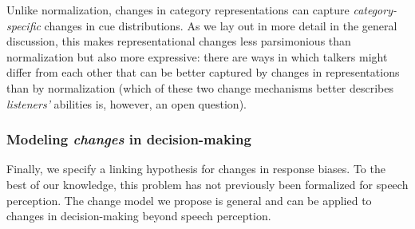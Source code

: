\documentclass[
  11pt,
  man,floatsintext]{apa6}
\begin{document}
Unlike normalization, changes in category representations can capture \emph{category-specific} changes in cue distributions. As we lay out in more detail in the general discussion, this makes representational changes less parsimonious than normalization but also more expressive: there are ways in which talkers might differ from each other that can be better captured by changes in representations than by normalization (which of these two change mechanisms better describes \emph{listeners'} abilities is, however, an open question).

\subsubsection{\texorpdfstring{Modeling \emph{changes} in decision-making}{Modeling changes in decision-making}}\label{sec:change-bias}

Finally, we specify a linking hypothesis for changes in response biases. To the best of our knowledge, this problem has not previously been formalized for speech perception. The change model we propose is general and can be applied to changes in decision-making beyond speech perception.
\end{document}
